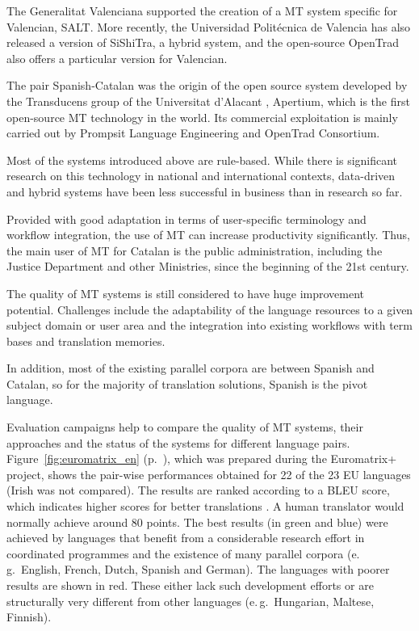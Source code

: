 \begin{multicols}{2}
The Generalitat Valenciana supported the creation of a MT system specific for Valencian, SALT. More recently, the Universidad Politécnica de Valencia has also released a version of SiShiTra, a hybrid system, and the open-source OpenTrad also offers a particular version for Valencian.

The pair Spanish-Catalan was the origin of the open source system developed by the Transducens \cite{CAT-transducens} group of the Universitat d'Alacant \cite{CAT-UnivAlacant}, Apertium, which is the first open-source MT technology in the world. Its commercial exploitation is mainly carried out by Prompsit Language Engineering and OpenTrad Consortium. 

Most of the systems introduced above are rule-based. While there is significant research on this technology in national and international contexts, data-driven and hybrid systems have been less successful in business than in research so far. 

Provided with good adaptation in terms of user-specific terminology and workflow integration, the use of MT can increase productivity significantly. Thus, the main user of MT for Catalan is the public administration, including the Justice Department and other Ministries, since the beginning of the 21st century. 

The quality of MT systems is still considered to have huge improvement potential. Challenges include the adaptability of the language resources to a given subject domain or user area and the integration into existing workflows with term bases and translation memories.

In addition, most of the existing parallel corpora are between Spanish and Catalan, so for the majority of translation solutions, Spanish is the pivot language.

Evaluation campaigns help to compare the quality of MT systems, their approaches and the status of the systems for different language pairs. Figure~\ref{fig:euromatrix_en} (p.~\pageref{fig:euromatrix_en}), which was prepared during the Euromatrix+ project, shows the pair-wise performances obtained for 22 of the 23 EU languages (Irish was not compared). The results are ranked according to a BLEU score, which indicates higher scores for better translations \cite{bleu1}. A human translator would normally achieve around 80 points. The best results (in green and blue) were achieved by languages that benefit from a considerable research effort in coordinated programmes and the existence of many parallel corpora (e.\,g.~English, French, Dutch, Spanish and German). The languages with poorer results are shown in red. These either lack such development efforts or are structurally very different from other languages (e.\,g.~Hungarian, Maltese, Finnish).


\end{multicols}
